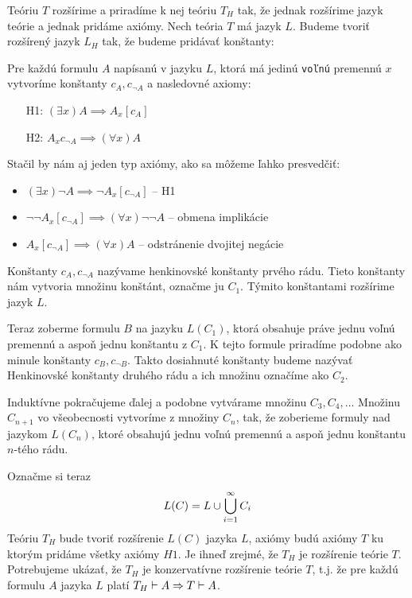 \begin{dokaz}
    Teóriu $T$ rozšírime a priradíme k nej teóriu $T_H$ tak, že
    jednak rozšírime jazyk teórie a jednak pridáme axiómy.
    Nech teória $T$ má jazyk $L$.
    Budeme tvoriť rozšírený jazyk $L_H$ tak, že budeme pridávať konštanty:

    Pre každú formulu $A$ napísanú v jazyku $L$,
    ktorá má jedinú {\tt voľnú} premennú $x$ 
    vytvoríme konštanty $c_A, c_{\neg A}$
    a nasledovné axiomy: 
    \begin{itemize}
        \item[H1:]  $(\exists x) A \implies A_x[c_A]$
        \item[H2:]  $A_x{c_{\neg A}} \implies (\forall x) A$
    \end{itemize}

    Stačil by nám aj jeden typ axiómy, ako sa môžeme ľahko presvedčiť:
    \begin{itemize}
        \item $(\exists x) \neg A \implies \neg A_x[c_{\neg A}]$ -- H1
        \item $\neg \neg A_x[c_{\neg A}] \implies
                (\forall x) \neg \neg A$ -- obmena implikácie
        \item $A_x[c_{\neg A}] \implies (\forall x) A$ -- odstránenie
            dvojitej negácie
    \end{itemize}

    Konštanty $c_A, c_{\neg A}$ nazývame henkinovské konštanty prvého
    rádu. Tieto konštanty nám vytvoria množinu konštánt, označme ju
    $C_1$. Týmito konštantami rozšírime jazyk $L$.
    
    Teraz zoberme formulu $B$ na jazyku $L(C_1)$, ktorá obsahuje práve
    jednu voľnú premennú a aspoň jednu konštantu z $C_1$. K tejto
    formule priradíme podobne ako minule konštanty $c_B, c_{\neg B}$.
    Takto dosiahnuté konštanty budeme nazývať Henkinovské konštanty
    druhého rádu a ich množinu označíme ako $C_2$.
    
    Induktívne pokračujeme ďalej a podobne vytvárame množinu $C_3,
    C_4, \dots$
    Množinu $C_{n+1}$ vo všeobecnosti vytvoríme z množiny $C_n$, tak,
    že zoberieme formuly nad jazykom $L(C_n)$, ktoré obsahujú jednu
    voľnú premennú a aspoň jednu konštantu $n$-tého rádu.

    Označme si teraz
    \begin{equation*}
        L(C) = L \cup \bigcup_{i=1}^{\infty} C_i
    \end{equation*}
    Teóriu $T_H$ bude tvoriť rozšírenie $L(C)$ jazyka $L$,
    axiómy budú axiómy $T$ ku ktorým pridáme všetky axiómy $H1$.
    Je ihneď zrejmé, že $T_H$ je rozšírenie teórie $T$.
    Potrebujeme ukázať, že $T_H$ je konzervatívne rozšírenie teórie $T$, t.j.
    že pre každú formulu $A$ jazyka $L$ platí 
    $T_H \vdash A \Rightarrow T \vdash A$.


\end{dokaz}
